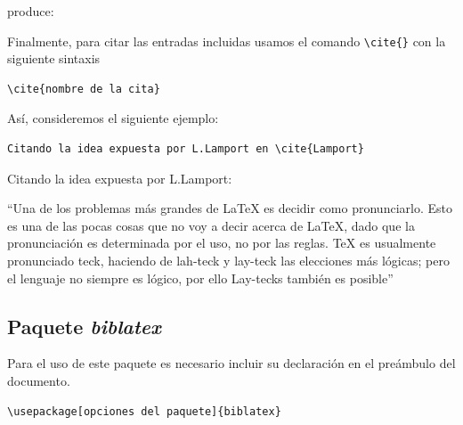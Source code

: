 \documentclass[a4,10pt]{aleph-notas}
\begin{document}
produce:

\begin{center}
{ \fboxsep 12pt
 }
\end{center}



Finalmente, para citar las entradas incluidas usamos el comando \verb"\cite{}" con la siguiente sintaxis

\begin{lstlisting}[frame=single]
\cite{nombre de la cita}
\end{lstlisting}

Así, consideremos el siguiente ejemplo:

\begin{lstlisting}[frame=single]
Citando la idea expuesta por L.Lamport en \cite{Lamport}
\end{lstlisting}

Citando la idea expuesta por L.Lamport:

\small\bfseries\itshape\begin{center}
``Una de los problemas más grandes de LaTeX es decidir como pronunciarlo. Esto es una de las pocas cosas que no voy a decir acerca de LaTeX, dado que la pronunciación es determinada por el uso, no por las reglas. TeX es usualmente pronunciado teck, haciendo de lah-teck y lay-teck las elecciones más lógicas; pero el lenguaje no siempre es lógico, por ello Lay-tecks también es posible'' \cite{Lamport}
\end{center}
\normalsize\mdseries\upshape

\subsection{Paquete \emph{biblatex}}

Para el uso de este paquete es necesario incluir su declaración en el preámbulo del documento.

\begin{lstlisting}[frame=single]
\usepackage[opciones del paquete]{biblatex}
\end{lstlisting}
\end{document}

